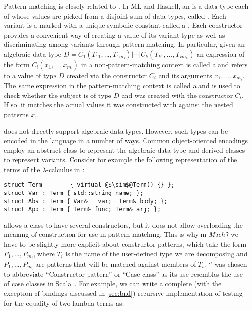 
Pattern matching is closely related to . In ML and Haskell, an 
 is a data type each of whose values are picked from a 
disjoint sum of data types, called . Each variant is a  marked with a unique symbolic constant called a . 
Each constructor provides a convenient way of creating a value of its variant type as 
well as discriminating among variants through pattern matching. In particular,
given an algebraic data type $D = C_1(T_{11},...,T_{1m_1}) | \cdots | C_k(T_{k1},...,T_{km_k})$
an expression of the form $C_i(x_1,...,x_{m_i})$ in a non-pattern-matching 
context is called a  and refers to a value of type $D$ 
created via the constructor $C_i$ and its arguments $x_1,...,x_{m_i}$. The~same 
expression in the pattern-matching context is called a  
and is used to check whether the subject is of type $D$ and was created with the
constructor $C_i$. If so, it matches the actual values it was constructed with against the nested patterns $x_j$.

\Cpp{} does not directly support algebraic data types. However, such types 
can be encoded in the language in a number of ways. Common 
object-oriented encodings employ an abstract class to represent the 
algebraic data type and derived classes to represent variants. Consider for 
example the following representation of the terms of the $\lambda$-calculus in \Cpp{}:

\begin{lstlisting}[columns=flexible,keepspaces]
struct Term        { virtual @$\sim$@Term() {} };
struct Var : Term { std::string name; };
struct Abs : Term { Var&   var;  Term& body; };
struct App : Term { Term& func; Term& arg; };
\end{lstlisting}

\noindent
\Cpp{} allows a class to have several constructors, but it does not allow 
overloading the meaning of construction for use in pattern matching. This is
why in \emph{Mach7} we have to be slightly more explicit about constructor patterns, 
which take the form $P_1,...,P_{m_i}$\code{)}, where $T_i$ is the name of 
the user-defined type we are decomposing and $P_1,...,P_{m_i}$ are patterns that 
will be matched against members of $T_i$. `' was chosen to abbreviate 
``Constructor pattern'' or ``Case class'' as its use resembles the use of case 
classes in Scala~\cite{Scala2nd}. For example, we can write a complete (with the 
exception of bindings discussed in \textsection\ref{sec:bnd}) recursive 
implementation of testing for the equality of two lambda terms as:

